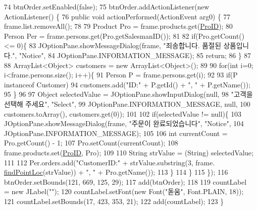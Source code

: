 \begin{DoxyCode}
74         btnOrder.setEnabled(\textcolor{keyword}{false});
75         btnOrder.addActionListener(\textcolor{keyword}{new} ActionListener() \{
76             \textcolor{keyword}{public} \textcolor{keywordtype}{void} actionPerformed(ActionEvent arg0) \{
77                 frame.list.removeAll();
78                 
79                 Product Pro = frame.products.get(\hyperlink{classpkg_1_1_product_panel_a24b4946f58b313219ef1521fa2b077f8}{ProID});
80                 Person Per = frame.persons.get(Pro.getSalesmanID());
81                 
82                 \textcolor{keywordflow}{if}(Pro.getCount() <= 0)\{
83                     JOptionPane.showMessageDialog(frame, \textcolor{stringliteral}{"죄송합니다. 품절된 상품입니다."}, \textcolor{stringliteral}{"Notice"}, 
84                             JOptionPane.INFORMATION\_MESSAGE);
85                     \textcolor{keywordflow}{return};
86                 \}
87                 
88                 ArrayList<Object> customers = \textcolor{keyword}{new} ArrayList<Object>();
89                 
90                 \textcolor{keywordflow}{for}(\textcolor{keywordtype}{int} i=0; i<frame.persons.size(); i++)\{
91                     Person P = frame.persons.get(i);
92                     
93                     \textcolor{keywordflow}{if}(P instanceof Customer)
94                         customers.add(\textcolor{stringliteral}{"ID:"} + P.getId() + \textcolor{stringliteral}{", "} + P.getName());
95                 \}
96                 
97                 Object selectedValue = JOptionPane.showInputDialog(null,
98                         \textcolor{stringliteral}{"고객을 선택해 주세요"}, \textcolor{stringliteral}{"Select"},
99                         JOptionPane.INFORMATION\_MESSAGE, null,
100                         customers.toArray(), customers.get(0));
101                 
102                 \textcolor{keywordflow}{if}(selectedValue != null)\{
103                     JOptionPane.showMessageDialog(frame, \textcolor{stringliteral}{"주문이 완료되었습니다"}, \textcolor{stringliteral}{"Notice"}, 
104                             JOptionPane.INFORMATION\_MESSAGE);
105                     
106                     \textcolor{keywordtype}{int} currentCount = Pro.getCount() - 1;
107                     Pro.setCount(currentCount);
108                     frame.products.set(\hyperlink{classpkg_1_1_product_panel_a24b4946f58b313219ef1521fa2b077f8}{ProID}, Pro);
109                     
110                     String strValue = (String) selectedValue;
111                     
112                     Per.orders.add(\textcolor{stringliteral}{"CustomerID:"} + strValue.substring(3, frame.
      \hyperlink{classpkg_1_1_management_u_i_a23fb9a0d7bae4106d1f604b6035de259}{findPointLoc}(strValue)) + \textcolor{stringliteral}{", "} + Pro.getName());
113                 \}
114             \}
115         \});
116         btnOrder.setBounds(121, 669, 125, 29);
117         add(btnOrder);
118         
119         countLabel = \textcolor{keyword}{new} JLabel(\textcolor{stringliteral}{""});
120         countLabel.setFont(\textcolor{keyword}{new} Font(\textcolor{stringliteral}{"돋움"}, Font.PLAIN, 18));
121         countLabel.setBounds(17, 423, 353, 21);
122         add(countLabel);
123     \}
\end{DoxyCode}


